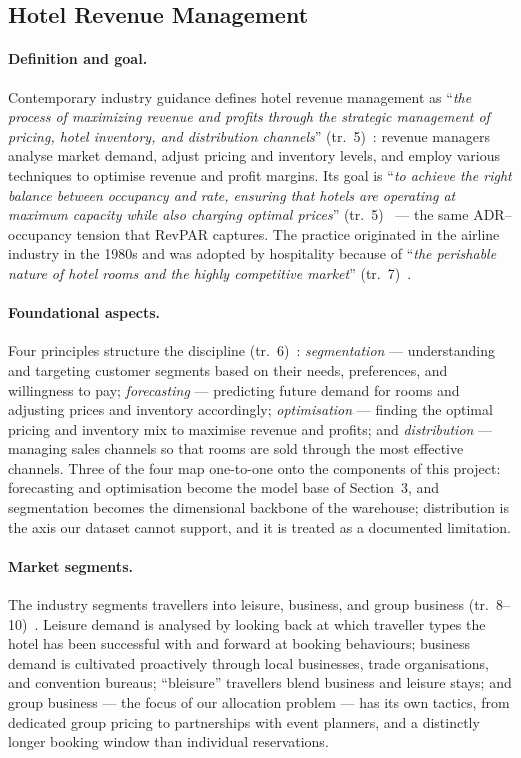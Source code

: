 \subsection{Hotel Revenue Management}

\paragraph{Definition and goal.}
Contemporary industry guidance defines hotel revenue management as ``\emph{the process of maximizing revenue and profits through the strategic management of pricing, hotel inventory, and distribution channels}'' (tr.~5)~\cite{amadeus2023}: revenue managers analyse market demand, adjust pricing and inventory levels, and employ various techniques to optimise revenue and profit margins. Its goal is ``\emph{to achieve the right balance between occupancy and rate, ensuring that hotels are operating at maximum capacity while also charging optimal prices}'' (tr.~5)~\cite{amadeus2023} --- the same ADR--occupancy tension that RevPAR captures. The practice originated in the airline industry in the 1980s and was adopted by hospitality because of ``\emph{the perishable nature of hotel rooms and the highly competitive market}'' (tr.~7)~\cite{amadeus2023}.

\paragraph{Foundational aspects.}
Four principles structure the discipline (tr.~6)~\cite{amadeus2023}: \emph{segmentation} --- understanding and targeting customer segments based on their needs, preferences, and willingness to pay; \emph{forecasting} --- predicting future demand for rooms and adjusting prices and inventory accordingly; \emph{optimisation} --- finding the optimal pricing and inventory mix to maximise revenue and profits; and \emph{distribution} --- managing sales channels so that rooms are sold through the most effective channels. Three of the four map one-to-one onto the components of this project: forecasting and optimisation become the model base of Section~3, and segmentation becomes the dimensional backbone of the warehouse; distribution is the axis our dataset cannot support, and it is treated as a documented limitation.

\paragraph{Market segments.}
The industry segments travellers into leisure, business, and group business (tr.~8--10)~\cite{amadeus2023}. Leisure demand is analysed by looking back at which traveller types the hotel has been successful with and forward at booking behaviours; business demand is cultivated proactively through local businesses, trade organisations, and convention bureaus; ``bleisure'' travellers blend business and leisure stays; and group business --- the focus of our allocation problem --- has its own tactics, from dedicated group pricing to partnerships with event planners, and a distinctly longer booking window than individual reservations.


